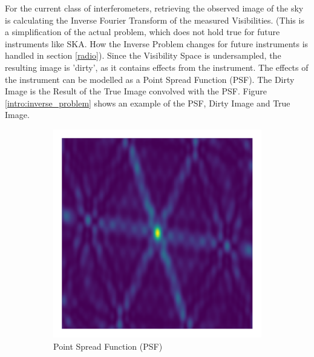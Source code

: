 For the current class of interferometers, retrieving the observed image of the sky is calculating the Inverse Fourier Transform of the measured Visibilities. (This is a simplification of the actual problem, which does not hold true for future instruments like SKA. How the Inverse Problem changes for future instruments is handled in section \ref{radio}). Since the Visibility Space is undersampled, the resulting image is 'dirty', as it contains effects from the instrument. The effects of the instrument can be modelled as a Point Spread Function (PSF). The Dirty Image is the Result of the True Image convolved with the PSF. Figure \ref{intro:inverse_problem} shows an example of the PSF, Dirty Image and True Image.
\begin{figure}[h!]
	\centering
	\begin{subfigure}[b]{0.3\linewidth}
		\includegraphics[width=\linewidth, trim={18px 19px 18px 18px}, clip]{./chapters/01.intro/img/psf.png}
		\caption{Point Spread Function (PSF)}
	\end{subfigure}
	\begin{subfigure}[b]{0.3\linewidth}

\end{subfigure}
\end{figure}
